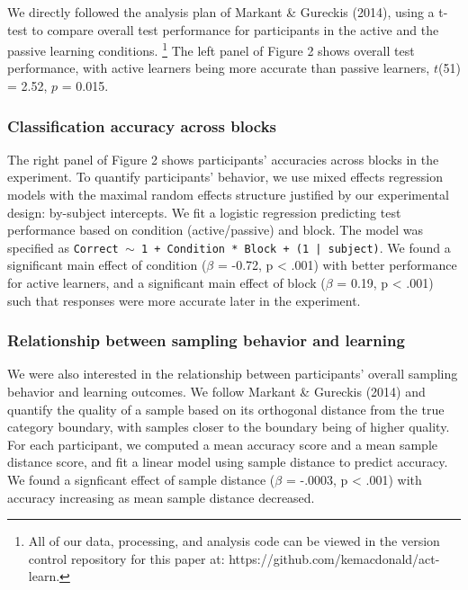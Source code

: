 \documentclass[10pt, letterpaper]{article}
\begin{document}
We directly followed the analysis plan of Markant \& Gureckis (2014),
using a t-test to compare overall test performance for participants in
the active and the passive learning conditions.
\footnote{All of our data, processing, and analysis code can be viewed in the version control repository for this paper at: https://github.com/kemacdonald/act-learn.}
The left panel of Figure 2 shows overall test performance, with active
learners being more accurate than passive learners, \(t\)(51) = 2.52,
\(p\) = 0.015.

\subsubsection{Classification accuracy across
blocks}\label{classification-accuracy-across-blocks}

The right panel of Figure 2 shows participants' accuracies across blocks
in the experiment. To quantify participants' behavior, we use mixed
effects regression models with the maximal random effects structure
justified by our experimental design: by-subject intercepts. We fit a
logistic regression predicting test performance based on condition
(active/passive) and block. The model was specified as
\texttt{Correct $\sim$ 1 + Condition * Block + (1 | subject)}. We found
a significant main effect of condition (\(\beta\) = -0.72, p \textless{}
.001) with better performance for active learners, and a significant
main effect of block (\(\beta\) = 0.19, p \textless{} .001) such that
responses were more accurate later in the experiment.

\subsubsection{Relationship between sampling behavior and
learning}\label{relationship-between-sampling-behavior-and-learning}

We were also interested in the relationship between participants'
overall sampling behavior and learning outcomes. We follow Markant \&
Gureckis (2014) and quantify the quality of a sample based on its
orthogonal distance from the true category boundary, with samples closer
to the boundary being of higher quality. For each participant, we
computed a mean accuracy score and a mean sample distance score, and fit
a linear model using sample distance to predict accuracy. We found a
signficant effect of sample distance (\(\beta\) = -.0003, p \textless{}
.001) with accuracy increasing as mean sample distance decreased.
\end{document}
